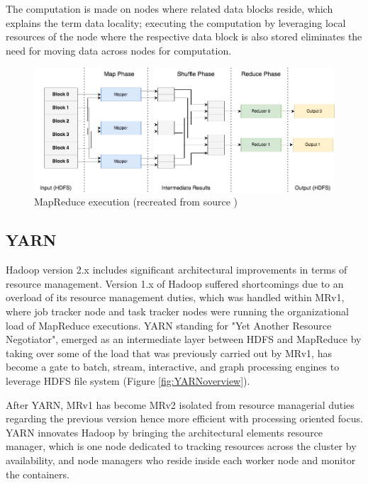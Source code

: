 \documentclass[review]{elsarticle}
\begin{document}
The computation is made on nodes where related data blocks reside, which explains the term data locality; executing the computation by leveraging local resources of the node where the respective data block is also stored eliminates the need for moving data across nodes for computation.

\begin{figure}[h!]
	\caption{MapReduce execution (recreated from source \cite{schatzle_giant_nodate})}
	\label{fig:MapReduce}
	\includegraphics[width=\textwidth]{MapReduce}
	\centering
\end{figure}

\subsection{YARN}\label{YARN}
Hadoop version 2.x includes significant architectural improvements in terms of resource management. Version 1.x of Hadoop suffered shortcomings due to an overload of its resource management duties, which was handled within MRv1, where job tracker node and task tracker nodes were running the organizational load of MapReduce executions. YARN standing for "Yet Another Resource Negotiator", emerged as an intermediate layer between HDFS and MapReduce by taking over some of the load that was previously carried out by MRv1, has become a gate to batch, stream, interactive, and graph processing engines to leverage HDFS file system (Figure \ref{fig:YARNoverview}). 

After YARN, MRv1 has become MRv2 isolated from resource managerial duties regarding the previous version hence more efficient with processing oriented focus. YARN innovates Hadoop by bringing the architectural elements resource manager, which is one node dedicated to tracking resources across the cluster by availability, and node managers who reside inside each worker node and monitor the containers.
\end{document}
